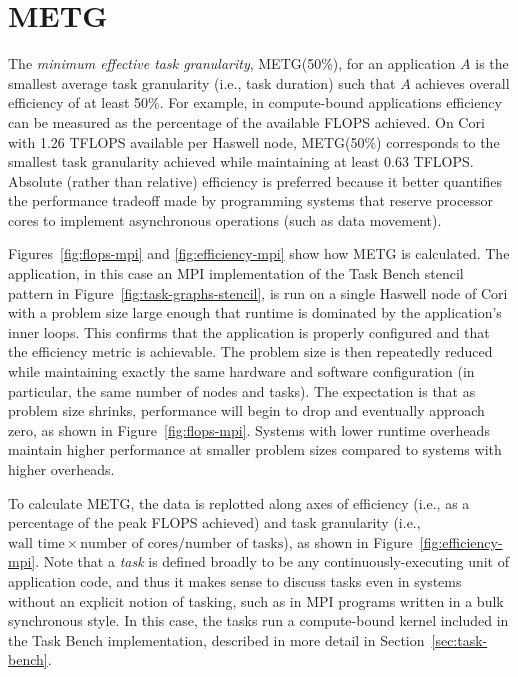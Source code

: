 \section{METG}
\label{sec:metg}




The \emph{minimum effective task granularity}, METG(50\%), for an application $A$ is
the smallest average task granularity (i.e., task duration) such that $A$
achieves overall efficiency of at least 50\%. For example, in
compute-bound applications efficiency can be measured as the
percentage of the available FLOPS achieved. On Cori with 1.26 TFLOPS available per Haswell node, METG(50\%) corresponds to
the smallest task granularity achieved while maintaining at least 0.63
TFLOPS. Absolute (rather than relative) efficiency is preferred
because it better quantifies the performance tradeoff made by
programming systems that reserve processor cores to implement asynchronous operations (such as data movement).

Figures~\ref{fig:flops-mpi} and \ref{fig:efficiency-mpi} show how METG is
calculated. The application, in this case an MPI implementation of the
Task Bench stencil pattern in Figure~\ref{fig:task-graphs-stencil}, is
run on a single Haswell node of Cori with a problem size large enough
that runtime is dominated by the application's inner loops. This confirms
that the application is properly configured and that the
efficiency metric is achievable. The problem
size is then repeatedly reduced while maintaining exactly the same hardware and software
configuration (in particular, the same number of nodes and tasks). The
expectation is that as problem size shrinks,
performance will begin to drop and eventually approach zero, as shown in Figure~\ref{fig:flops-mpi}. Systems
with lower runtime overheads maintain higher performance at smaller
problem sizes compared to systems with higher overheads.

To calculate METG, the data is replotted along axes of efficiency
(i.e., as a percentage of the peak FLOPS achieved) and task
granularity (i.e., $\text{wall time} \times \text{number of
  cores}/\text{number of tasks}$), as shown in Figure~\ref{fig:efficiency-mpi}. Note that a \emph{task} is defined
broadly to be any continuously-executing unit of application code,
and thus it makes sense to discuss tasks even in systems
without an explicit notion of tasking, such as in MPI programs written in a bulk synchronous style. In this case, the tasks run a
compute-bound kernel included in the Task Bench implementation,
described in more detail in Section~\ref{sec:task-bench}.


